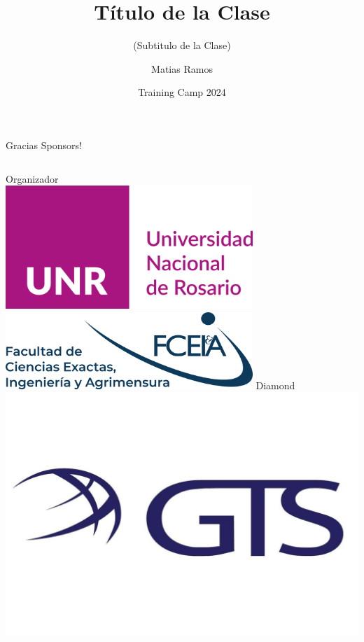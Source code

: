\documentclass{beamer}
\title %
{Título de la Clase}
\subtitle{(Subtitulo de la Clase)}
\author[Matias Ramos]{Matias Ramos}
\institute[]{Universidad Tecnológica Nacional - Facultad Regional Santa Fe}
\date[TC 2024]{Training Camp 2024}
\begin{document}
\frame{\titlepage}



\begin{frame}{Gracias Sponsors!}
    \begin{columns}[t]
        \centering
        Organizador\\
        \vspace{0.8cm}
        \includegraphics[width=0.7\textwidth,keepaspectratio]{logos/UNRlogo.png}
        \includegraphics[width=0.7\textwidth,keepaspectratio]{logos/FCEIA.png}
        \centering
        Diamond\\
        \includegraphics[width=1\textwidth,keepaspectratio]{logos/GTSlogo.jpeg}

\end{columns}
\end{frame}
\end{document}
